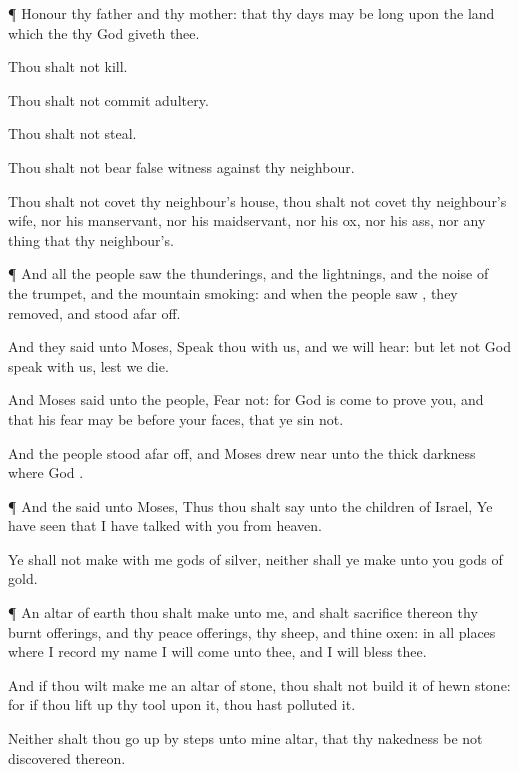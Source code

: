 {\par }{\PP {}¶
Honour thy
father and thy
mother: that thy
days may be
long upon the
land which the
{} thy
God
giveth thee.

Thou shalt not
kill.

Thou shalt not commit
adultery.

Thou shalt not
steal.

Thou shalt not
bear
false
witness against thy
neighbour.

Thou shalt not
covet thy
neighbour’s
house, thou shalt not
covet thy
neighbour’s
wife, nor his
manservant, nor his
maidservant, nor his
ox, nor his
ass, nor any thing that
{} thy
neighbour’s.


\par }{\PP {}¶ And all the
people
saw the
thunderings, and the
lightnings, and the
noise of the
trumpet, and the
mountain
smoking: and when the
people
saw
{}, they
removed, and
stood afar
off.

And they
said unto
Moses,
Speak thou with us, and we will
hear: but let not
God
speak with us, lest we
die.

And
Moses
said unto the
people,
Fear not: for
God is
come
to
prove you, and that his
fear may be before your
faces, that ye
sin not.

And the
people
stood afar
off, and
Moses drew
near unto the thick
darkness where
God
{}.


\par }{\PP {}¶ And the
{}
said unto
Moses, Thus thou shalt
say unto the
children of
Israel, Ye have
seen that I have
talked with you from
heaven.

Ye shall not
make with me
gods of
silver, neither shall ye
make unto you
gods of
gold.


\par }{\PP {}¶ An
altar of
earth thou shalt
make unto me, and shalt
sacrifice thereon thy burnt
offerings, and thy peace
offerings, thy
sheep, and thine
oxen: in all
places where I
record my
name I will
come unto thee, and I will
bless thee.

And if thou wilt
make me an
altar of
stone, thou shalt not
build it of hewn
stone: for if thou lift
up thy
tool upon it, thou hast
polluted it.

Neither shalt thou go
up by
steps unto mine
altar, that thy
nakedness be not
discovered thereon.




}
